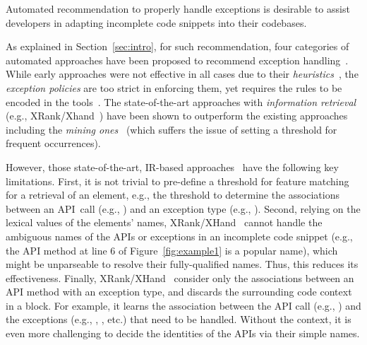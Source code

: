 \begin{Observation} 
\label{ob1}
Automated recommendation to properly handle exceptions is desirable to
assist developers in adapting incomplete code snippets into their
codebases.
\end{Observation}


As explained in Section~\ref{sec:intro}, for such recommendation, four
categories of automated approaches have been proposed to recommend
exception
handling~\cite{xrank-fse20,barbosa-bsse12,chanchal-scam14,barbosa-tse18,barbosa-tse16}. While
early approaches were not effective in all cases due to their {\em
  heuristics}~\cite{barbosa-bsse12}, the {\em exception policies} are
too strict in enforcing them, yet requires the rules to be encoded in
the tools~\cite{barbosa-tse16,barbosa-saner18}. The state-of-the-art
approaches with {\em information retrieval} (e.g.,
XRank/Xhand~\cite{xrank-fse20}) have been shown to outperform the
existing approaches including the {\em mining
  ones}~\cite{chanchal-scam14} (which suffers the issue of setting a
threshold for frequent occurrences).


However, those state-of-the-art, IR-based
approaches~\cite{xrank-fse20} have the following key
limitations. First, it is not trivial to pre-define a threshold for
feature matching for a retrieval of an element, e.g., the threshold to
determine the associations between an API~call (e.g.,
) and an exception type (e.g.,
). Second, relying on the lexical
values of the elements' names, XRank/XHand~\cite{xrank-fse20} cannot
handle the ambiguous names of the APIs or exceptions in an incomplete
code snippet (e.g., the API method  at line 6 of
Figure~\ref{fig:example1} is a popular name), which might be
unparseable to resolve their fully-qualified names. Thus, this reduces
its effectiveness. Finally, XRank/XHand~\cite{xrank-fse20} consider
only the associations between an API method with an exception type,
and discards the surrounding code context in a  block.
For example, it learns the association between the API call (e.g.,
) and the exceptions (e.g.,
, , etc.)
that need to be handled. Without the context, it is even more
challenging to decide the identities of the APIs via their simple
names.

